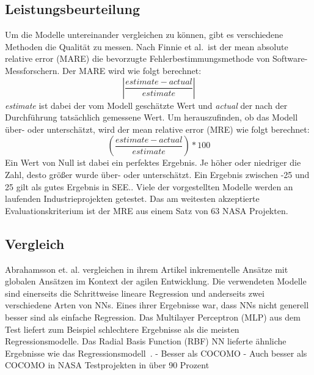 \subsection{Leistungsbeurteilung}
Um die Modelle untereinander vergleichen zu können, gibt es verschiedene Methoden die Qualität zu messen. Nach Finnie et al\cite{Finnie1996}.~ist der mean absolute relative error (MARE) die bevorzugte Fehlerbestimmungsmethode von Software-Messforschern. Der MARE wird wie folgt berechnet:
\begin{equation}
\left|\frac{estimate - actual}{estimate}\right|
\end{equation}
\textit{estimate} ist dabei der vom Modell geschätzte Wert und \textit{actual} der nach der Durchführung tatsächlich gemessene Wert. Um herauszufinden, ob das Modell über- oder unterschätzt, wird der mean relative error (MRE) wie folgt berechnet:
\begin{equation}
\left(\frac{estimate - actual}{estimate}\right)*100
\end{equation}
Ein Wert von Null ist dabei ein perfektes Ergebnis. Je höher oder niedriger die Zahl, desto größer wurde über- oder unterschätzt.\cite{Finnie1996} Ein Ergebnis zwischen -25 und 25 gilt als gutes Ergebnis in SEE.\cite{Abrahamsson2007}. Viele der vorgestellten Modelle werden an laufenden Industrieprojekten getestet. Das am weitesten akzeptierte Evaluationskriterium ist der MRE aus einem Satz von 63 NASA Projekten.\cite{Khalifelu2012}

\subsection{Vergleich}
Abrahamsson et. al. vergleichen in ihrem Artikel inkrementelle Ansätze mit globalen Ansätzen im Kontext der agilen Entwicklung. Die verwendeten Modelle sind einerseits die Schrittweise lineare Regression und anderseits zwei verschiedene Arten von NNs. Eines ihrer Ergebnisse war, dass NNs nicht generell besser sind als einfache Regression. Das Multilayer Perceptron (MLP) aus dem Test liefert zum Beispiel schlechtere Ergebnisse als die meisten Regressionsmodelle. Das Radial Basis Function (RBF) NN lieferte ähnliche Ergebnisse wie das Regressionsmodell~\cite{Abrahamsson2007}.
- Besser als COCOMO\cite{Khalifelu2012}
- Auch besser als COCOMO in NASA Testprojekten in über 90 Prozent\cite{Gharehchopogh2011}
\\
\\
\\
\\
\\